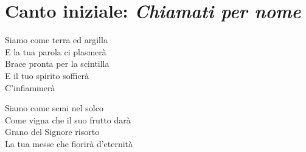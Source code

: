 \newpage
\thispagestyle{empty}
\mbox{}   %

\newpage

\setcounter{page}{1}

\section*{Canto iniziale: \textit{Chiamati per nome}}

	\begin{mystrofe}
	\end{mystrofe}

	\begin{mystrofe}
		Siamo come terra ed argilla \\
		E la tua parola ci plasmerà \\
		Brace pronta per la scintilla \\
		E il tuo spirito soffierà \\
		C'infiammerà
	\end{mystrofe}

	\begin{mystrofe}
		\ritornello{}
	\end{mystrofe}

	\begin{mystrofe}
		Siamo come semi nel solco \\
		Come vigna che il suo frutto darà \\
		Grano del Signore risorto \\
		La tua messe che fiorirà d'eternità
	\end{mystrofe}

	\begin{mystrofe}
		\ritornello{}
	\end{mystrofe}




